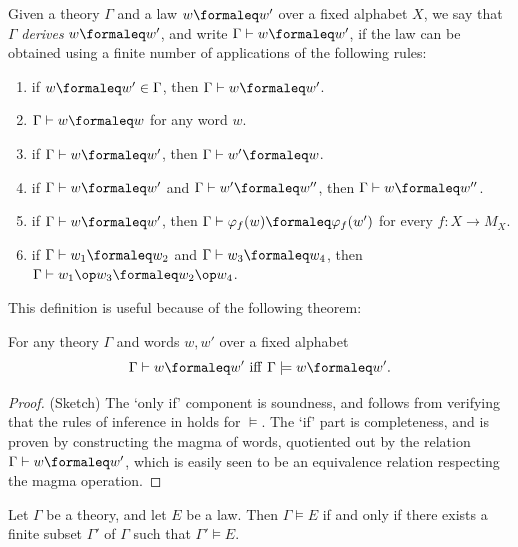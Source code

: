 \begin{definition}[Derivation]\label{derivation-def}
  \leanok
  Given a theory $\Gamma$ and a law $w\formaleq w'$ over a fixed alphabet $X$, we say that
  $\Gamma$ \emph{derives} $w\formaleq w'$, and write $\Gamma\vdash w\formaleq w'$, if the law can
  be obtained using a finite number of applications of the following rules:
  \begin{enumerate}
    \item if $w\formaleq w' \in \Gamma$, then $\Gamma\vdash w\formaleq w'$.
    \item $\Gamma\vdash w\formaleq w$ for any word $w$.
    \item if $\Gamma\vdash w\formaleq w'$, then $\Gamma\vdash w'\formaleq w$.
    \item if $\Gamma\vdash w\formaleq w'$ and $\Gamma\vdash w'\formaleq w''$, then $\Gamma\vdash w\formaleq w''$.
    \item if $\Gamma\vdash w\formaleq w'$, then $\Gamma\vdash \varphi_f(w) \formaleq \varphi_f(w')$ for every $f: X \to M_X$.
    \item if $\Gamma\vdash w_1\formaleq w_2$ and $\Gamma\vdash w_3\formaleq w_4$, then $\Gamma\vdash w_1 \op w_3\formaleq w_2\op w_4$.
  \end{enumerate}
\end{definition}

This definition is useful because of the following theorem:

\begin{theorem}\label{sound-complete}\leanok{}
  For any theory $\Gamma$ and words $w, w'$ over a fixed alphabet
  $$ \Gamma\vdash w\formaleq w'\ \mathrm{iff}\ \Gamma\models w\formaleq w'.$$
\end{theorem}

\begin{proof}
  \leanok
  (Sketch) The `only if' component is soundness, and follows from verifying that the rules of inference in  holds for $\models$. The `if' part is completeness, and is proven by constructing the magma of words, quotiented out by the relation $\Gamma \vdash w \formaleq w'$, which is easily seen to be an equivalence relation respecting the magma operation.
\end{proof}

\begin{corollary}\label{compactness-thm}
  Let $\Gamma$ be a theory, and let $E$ be a law.
  Then $\Gamma \models E$ if and only if there exists a finite subset $\Gamma'$ of $\Gamma$ such that $\Gamma' \models E$.
\end{corollary}

